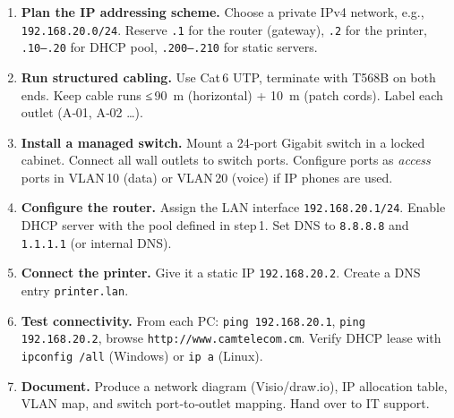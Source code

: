 \documentclass[11pt]{article}
\begin{document}
\begin{methode}
\begin{enumerate}
\item \textbf{Plan the IP addressing scheme.} Choose a private IPv4 network, e.g., \texttt{192.168.20.0/24}. Reserve \texttt{.1} for the router (gateway), \texttt{.2} for the printer, \texttt{.10–.20} for DHCP pool, \texttt{.200–.210} for static servers.
\item \textbf{Run structured cabling.} Use Cat 6 UTP, terminate with T568B on both ends. Keep cable runs ≤ \SI{90}{m} (horizontal) + \SI{10}{m} (patch cords). Label each outlet (A‑01, A‑02 …).
\item \textbf{Install a managed switch.} Mount a 24‑port Gigabit switch in a locked cabinet. Connect all wall outlets to switch ports. Configure ports as \emph{access} ports in VLAN 10 (data) or VLAN 20 (voice) if IP phones are used.
\item \textbf{Configure the router.} Assign the LAN interface \texttt{192.168.20.1/24}. Enable DHCP server with the pool defined in step 1. Set DNS to \texttt{8.8.8.8} and \texttt{1.1.1.1} (or internal DNS).
\item \textbf{Connect the printer.} Give it a static IP \texttt{192.168.20.2}. Create a DNS entry \texttt{printer.lan}.
\item \textbf{Test connectivity.} From each PC: \texttt{ping 192.168.20.1}, \texttt{ping 192.168.20.2}, browse \texttt{http://www.camtelecom.cm}. Verify DHCP lease with \texttt{ipconfig /all} (Windows) or \texttt{ip a} (Linux).
\item \textbf{Document.} Produce a network diagram (Visio/draw.io), IP allocation table, VLAN map, and switch port‑to‑outlet mapping. Hand over to IT support.
\end{enumerate}
\end{methode}
\end{document}
